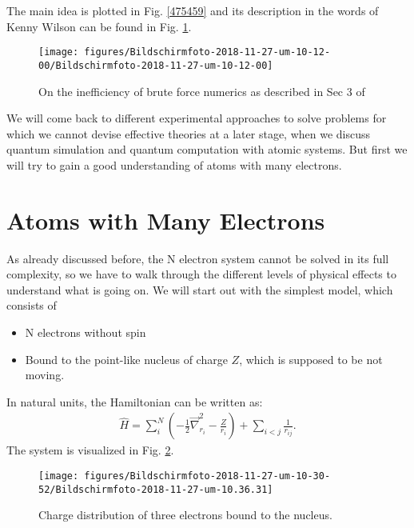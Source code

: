\documentclass[10pt]{article}
\let\cite\citep
\providecommand\citep{\cite}
\begin{document}
The main idea is plotted in Fig. \ref{475459} and its description in the words of Kenny Wilson can be found in Fig. \ref{139900}.
\begin{figure}[h!]
\begin{center}
\texttt{[image: figures/Bildschirmfoto-2018-11-27-um-10-12-00/Bildschirmfoto-2018-11-27-um-10-12-00]}
\caption{{On the inefficiency of brute force numerics as described in Sec 3 of
\protect\cite{Wilson_1975}
{\label{139900}}%
}}
\end{center}
\end{figure}

We will come back to different experimental approaches to solve problems for which we cannot devise effective theories at a later stage, when we discuss quantum simulation and quantum computation with atomic systems. But first we will try to gain a good understanding of atoms with many electrons. 

\section{Atoms with Many Electrons }
As already discussed before, the N electron system cannot be solved in its full complexity, so we have to walk through the different levels of physical effects to understand what is going on. We will start out with the simplest model, which consists of  \begin{itemize}
\item N electrons without spin
\item Bound to the point-like nucleus of charge $Z$, which is supposed to be not moving.
\end{itemize}

In natural units, the Hamiltonian can be written as:
\begin{align}
\hat{H} = \sum_i^N \left(-\frac{1}{2} \vec{\nabla}^2_{r_i} - \frac{Z}{r_i} \right) + \sum_{i<j} \frac{1}{r_{ij}}. \label{eq:manyelectronhamiltonian}
\end{align}
%
The system is visualized in Fig. \ref{613170}.
\begin{figure}[h!]
\begin{center}
\texttt{[image: figures/Bildschirmfoto-2018-11-27-um-10-30-52/Bildschirmfoto-2018-11-27-um-10.36.31]}
\caption{{Charge distribution of three electrons bound to the nucleus.
{\label{613170}}%
}}
\end{center}
\end{figure}
\end{document}
